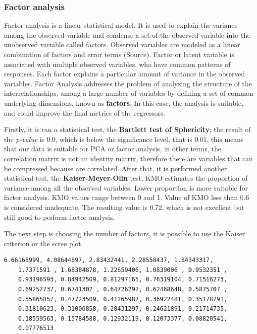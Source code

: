 \subsubsection{Factor analysis}

Factor analysis is a linear statistical model. It is used to explain the variance among the observed variable and condense a set of the observed variable into the unobserved variable called factors. Observed variables are modeled as a linear combination of factors and error terms (Source). Factor or latent variable is associated with multiple observed variables, who have common patterns of responses. Each factor explains a particular amount of variance in the observed variables.
Factor Analysis addresses the problem of analyzing the structure of the interrelationships, among a large number of variables by defining a set of common underlying dimensions, known as \textbf{factors}. In this case, the analysis is suitable, and could improve the final metrics of the regressors.

Firstly, it is ran a statistical test, the \textbf{Bartlett test of Sphericity}; the result of the \textit{p-value} is 0.0, which is below the significance level, that is 0.01, this means that our data is suitable for PCA or factor analysis, in other terms, the correlation matrix is not an identity matrix, therefore there are variables that can be compressed because are correlated.
After that, it is performed another statistical test, the \textbf{Kaiser-Meyer-Olin} test. KMO estimates the proportion of variance among all the observed variables. Lower proportion is more suitable for factor analysis. KMO values range between 0 and 1. Value of KMO less than 0.6 is considered inadequate. The resulting value is 0.72, which is not excellent but still good to perform factor analysis.

The next step is choosing the number of factors, it is possible to use the Kaiser criterion or the scree plot.

\begin{lstlisting}[caption=Eigenvalues vector, label=lst:eig, numbers=none]
    6.66168999, 4.08644897, 2.83432441, 2.28558437, 1.84343317,
    1.7371591 , 1.68384878, 1.22659406, 1.0839006 , 0.9532351 ,
    0.93196593, 0.84942509, 0.81297165, 0.76319104, 0.71516273,
    0.69252737, 0.6741302 , 0.64726297, 0.62468648, 0.5875707 ,
    0.55865857, 0.47723509, 0.41265987, 0.36922481, 0.35178791,
    0.31810623, 0.31006858, 0.28431297, 0.24621891, 0.21714735,
    0.18559563, 0.15784588, 0.12932119, 0.12073377, 0.08820541,
    0.07776513
\end{lstlisting}

